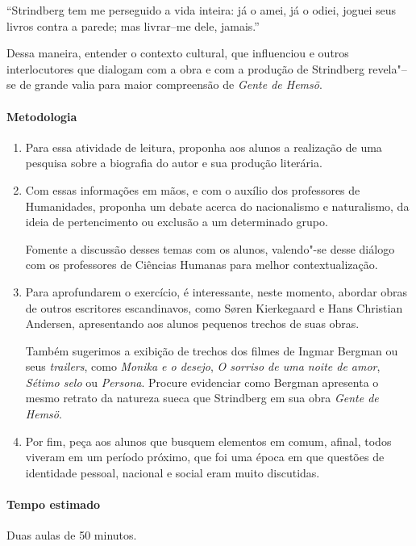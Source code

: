 \documentclass[12pt]{extarticle}
\begin{document}
``Strindberg tem me perseguido a vida inteira: já o
amei, já o odiei, joguei seus livros contra a
parede; mas livrar--me dele, jamais.''

Dessa maneira, entender o contexto cultural, que influenciou  e outros 
interlocutores que dialogam com a obra e com a produção de Strindberg 
revela"--se de grande valia para maior compreensão de \emph{Gente de Hemsö}.

\paragraph{Metodologia}

\begin{enumerate}

\item
Para essa atividade de leitura, proponha aos alunos a realização de uma 
pesquisa sobre a biografia do autor e sua produção literária. 

\item
Com essas informações em mãos, e com o auxílio dos professores de
Humanidades, proponha um debate acerca do nacionalismo e naturalismo, da 
ideia de pertencimento ou exclusão a um determinado grupo.

Fomente a discussão desses temas com os
alunos, valendo"-se desse diálogo com os professores de Ciências Humanas 
para melhor contextualização. 

\item
Para aprofundarem o exercício, é interessante, neste momento, abordar 
obras de outros escritores escandinavos, como Søren Kierkegaard e Hans 
Christian Andersen, apresentando aos alunos pequenos trechos de suas obras.

Também sugerimos a exibição de trechos dos filmes de Ingmar Bergman 
ou seus \textit{trailers}, 
como \emph{Monika e o desejo}, \emph{O sorriso de uma noite de amor}, 
\emph{Sétimo selo} ou \emph{Persona}. Procure evidenciar como Bergman 
apresenta o mesmo retrato da 
natureza sueca que Strindberg em sua obra \emph{Gente de Hemsö}. 

\item
Por fim, peça aos alunos que busquem elementos em comum, afinal, todos 
viveram em um período próximo, que foi uma época em que questões de 
identidade pessoal, nacional e social eram muito discutidas.

\end{enumerate}

\paragraph{Tempo estimado} Duas aulas de 50 minutos.
\end{document}
